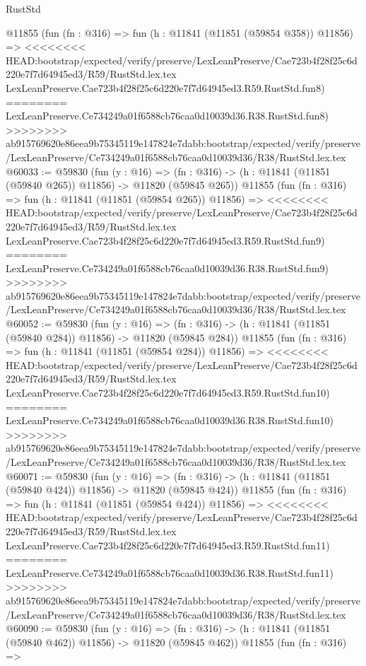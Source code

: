 \begin{lexlean}{RustStd}
\begin{coremodule}
{\begin{coremodule}
{{{{{{{{{{{{{{{{{{{{{{{{{{{{{{{{{{{{{{{{{{{{{{{{{{    @11855
    (fun (fn : @316) =>
    fun (h : @11841 (@11851 (@59854 @358)) @11856) =>
<<<<<<<< HEAD:bootstrap/expected/verify/preserve/LexLeanPreserve/Cae723b4f28f25c6d220e7f7d64945ed3/R59/RustStd.lex.tex
    LexLeanPreserve.Cae723b4f28f25c6d220e7f7d64945ed3.R59.RustStd.fun8)
========
    LexLeanPreserve.Ce734249a01f6588cb76caa0d10039d36.R38.RustStd.fun8)
>>>>>>>> ab915769620e86eea9b75345119e147824e7dabb:bootstrap/expected/verify/preserve/LexLeanPreserve/Ce734249a01f6588cb76caa0d10039d36/R38/RustStd.lex.tex
@60033 := @59830
    (fun (y : @16) =>
    (fn : @316) -> (h : @11841 (@11851 (@59840 @265)) @11856) -> @11820 (@59845 @265))
    @11855
    (fun (fn : @316) =>
    fun (h : @11841 (@11851 (@59854 @265)) @11856) =>
<<<<<<<< HEAD:bootstrap/expected/verify/preserve/LexLeanPreserve/Cae723b4f28f25c6d220e7f7d64945ed3/R59/RustStd.lex.tex
    LexLeanPreserve.Cae723b4f28f25c6d220e7f7d64945ed3.R59.RustStd.fun9)
========
    LexLeanPreserve.Ce734249a01f6588cb76caa0d10039d36.R38.RustStd.fun9)
>>>>>>>> ab915769620e86eea9b75345119e147824e7dabb:bootstrap/expected/verify/preserve/LexLeanPreserve/Ce734249a01f6588cb76caa0d10039d36/R38/RustStd.lex.tex
@60052 := @59830
    (fun (y : @16) =>
    (fn : @316) -> (h : @11841 (@11851 (@59840 @284)) @11856) -> @11820 (@59845 @284))
    @11855
    (fun (fn : @316) =>
    fun (h : @11841 (@11851 (@59854 @284)) @11856) =>
<<<<<<<< HEAD:bootstrap/expected/verify/preserve/LexLeanPreserve/Cae723b4f28f25c6d220e7f7d64945ed3/R59/RustStd.lex.tex
    LexLeanPreserve.Cae723b4f28f25c6d220e7f7d64945ed3.R59.RustStd.fun10)
========
    LexLeanPreserve.Ce734249a01f6588cb76caa0d10039d36.R38.RustStd.fun10)
>>>>>>>> ab915769620e86eea9b75345119e147824e7dabb:bootstrap/expected/verify/preserve/LexLeanPreserve/Ce734249a01f6588cb76caa0d10039d36/R38/RustStd.lex.tex
@60071 := @59830
    (fun (y : @16) =>
    (fn : @316) -> (h : @11841 (@11851 (@59840 @424)) @11856) -> @11820 (@59845 @424))
    @11855
    (fun (fn : @316) =>
    fun (h : @11841 (@11851 (@59854 @424)) @11856) =>
<<<<<<<< HEAD:bootstrap/expected/verify/preserve/LexLeanPreserve/Cae723b4f28f25c6d220e7f7d64945ed3/R59/RustStd.lex.tex
    LexLeanPreserve.Cae723b4f28f25c6d220e7f7d64945ed3.R59.RustStd.fun11)
========
    LexLeanPreserve.Ce734249a01f6588cb76caa0d10039d36.R38.RustStd.fun11)
>>>>>>>> ab915769620e86eea9b75345119e147824e7dabb:bootstrap/expected/verify/preserve/LexLeanPreserve/Ce734249a01f6588cb76caa0d10039d36/R38/RustStd.lex.tex
@60090 := @59830
    (fun (y : @16) =>
    (fn : @316) -> (h : @11841 (@11851 (@59840 @462)) @11856) -> @11820 (@59845 @462))
    @11855
    (fun (fn : @316) =>
}}}}}}}}}}}}}}}}}}}}}}}}}}}}}}}}}}}}}}}}}}}}}}}}}}
\end{coremodule}}
\end{coremodule}
\end{lexlean}
